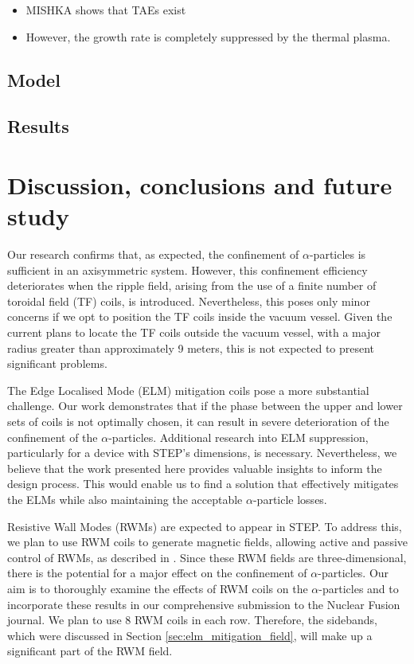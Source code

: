 \documentclass[10pt, a4paper, twoside]{article}
\begin{document}
\begin{itemize}
    \item MISHKA shows that TAEs exist
    \item However, the growth rate is completely suppressed by the thermal plasma. 
\end{itemize}

\subsection{Model}

\subsection{Results}

\section{Discussion, conclusions and future study}
\label{sec:discussion_and_conclusions}

Our research confirms that, as expected, the confinement of $\alpha$-particles is sufficient in an axisymmetric system. However, this confinement efficiency deteriorates when the ripple field, arising from the use of a finite number of toroidal field (TF) coils, is introduced. Nevertheless, this poses only minor concerns if we opt to position the TF coils inside the vacuum vessel. Given the current plans to locate the TF coils outside the vacuum vessel, with a major radius greater than approximately 9 meters, this is not expected to present significant problems.

The Edge Localised Mode (ELM) mitigation coils pose a more substantial challenge. Our work demonstrates that if the phase between the upper and lower sets of coils is not optimally chosen, it can result in severe deterioration of the confinement of the $\alpha$-particles. Additional research into ELM suppression, particularly for a device with STEP's dimensions, is necessary. Nevertheless, we believe that the work presented here provides valuable insights to inform the design process. This would enable us to find a solution that effectively mitigates the ELMs while also maintaining the acceptable $\alpha$-particle losses.

Resistive Wall Modes (RWMs) are expected to appear in STEP. To address this, we plan to use RWM coils to generate magnetic fields, allowing active and passive control of RWMs, as described in \cite{xia2023}. Since these RWM fields are three-dimensional, there is the potential for a major effect on the confinement of $\alpha$-particles. Our aim is to thoroughly examine the effects of RWM coils on the $\alpha$-particles and to incorporate these results in our comprehensive submission to the Nuclear Fusion journal. We plan to use 8 RWM coils in each row. Therefore, the sidebands, which were discussed in Section \ref{sec:elm_mitigation_field}, will make up a significant part of the RWM field.
\end{document}
